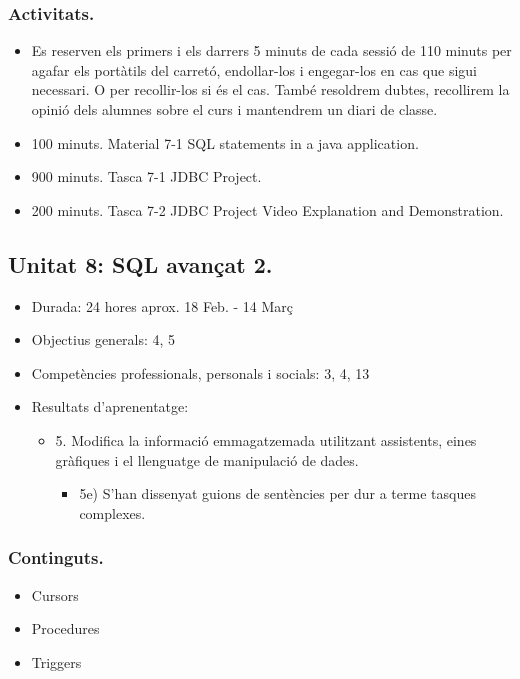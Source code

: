 \documentclass[catalan, a4paper, 12pt, titlepage]{article}
\begin{document}
  \subsubsection{Activitats.}
  \begin{itemize}
          \item Es reserven els primers i els darrers 5 minuts de cada sessió de 110 minuts per agafar els portàtils del carretó, endollar-los i engegar-los en cas que sigui necessari. O per recollir-los si és el cas. També resoldrem dubtes, recollirem la opinió dels alumnes sobre el curs i mantendrem un diari de classe.
	  \item 100 minuts. Material 7-1 SQL statements in a java application.
	  \item 900 minuts. Tasca 7-1 JDBC Project.
	  \item 200 minuts. Tasca 7-2 JDBC Project Video Explanation and Demonstration.
  \end{itemize}

  \subsection{Unitat 8: SQL avançat 2.}

  \begin{itemize}
	\item Durada: 24 hores aprox. 18 Feb. - 14 Març
	\item Objectius generals: 4, 5
	\item Competències professionals, personals i socials: 3, 4, 13
	\item Resultats d'aprenentatge: 
		\begin{itemize}
			\item 5. Modifica la informació emmagatzemada utilitzant assistents, eines gràfiques i el llenguatge de manipulació de dades.
				\begin{itemize}
					\item 5e) S'han dissenyat guions de sentències per dur a terme tasques complexes.
				\end{itemize}
		\end{itemize}
  \end{itemize}

  \subsubsection{Continguts.}
  \begin{itemize}
	  \item Cursors
	  \item Procedures
	  \item Triggers
  \end{itemize}
\end{document}
